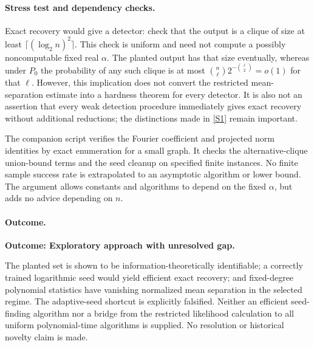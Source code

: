 \documentclass[11pt,a4paper]{article}
\newcommand{\sref}[2]{\hyperlink{source:#1:#2}{[S#2]}}
\numberwithin{equation}{section}
\begin{document}
\paragraph{Stress test and dependency checks.}
Exact recovery would give a detector: check that the output is a
clique of size at least $\lceil(\log_2 n)^2\rceil$.  This check is
uniform and need not compute a possibly noncomputable fixed real
$\alpha$.  The planted output has that size eventually, whereas under
$P_0$ the probability of any such clique is at most
$\binom n\ell2^{-\binom\ell2}=o(1)$ for that $\ell$.
However, this implication does not convert the restricted
mean-separation estimate into a hardness theorem for every detector.
It is also not an assertion that every weak detection procedure
immediately gives exact recovery without additional reductions;
the distinctions made in \sref{132}{1} remain important.

The companion script verifies the Fourier coefficient and projected
norm identities by exact enumeration for a small graph.  It checks
the alternative-clique union-bound terms and the seed cleanup on
specified finite instances.  No finite sample success rate is
extrapolated to an asymptotic algorithm or lower bound.  The argument
allows constants and algorithms to depend on the fixed $\alpha$, but
adds no advice depending on $n$.

\paragraph{Outcome.}
\textbf{Outcome: Exploratory approach with unresolved gap.}

The planted set is shown to be information-theoretically identifiable;
a correctly trained logarithmic seed would yield efficient exact
recovery; and fixed-degree polynomial statistics have vanishing
normalized mean separation in the selected regime.  The adaptive-seed
shortcut is explicitly falsified.  Neither an efficient seed-finding
algorithm nor a bridge from the restricted likelihood calculation to
all uniform polynomial-time algorithms is supplied.  No resolution
or historical novelty claim is made.
\end{document}
